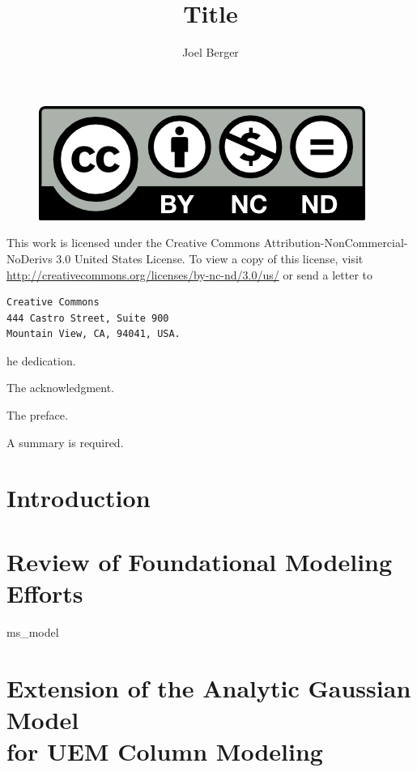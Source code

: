 \documentclass{uicthesi}
\title{Title}
\author{Joel Berger}
\begin{document}
\maketitle

\newpage
\begin{figure}
  \centering
  \includegraphics{by-nc-nd}
\end{figure}
This work is licensed under the Creative Commons Attribution-NonCommercial-NoDerivs 3.0 United States License.
To view a copy of this license, visit \url{http://creativecommons.org/licenses/by-nc-nd/3.0/us/} or send a letter to
\begin{verbatim}
Creative Commons
444 Castro Street, Suite 900
Mountain View, CA, 94041, USA.
\end{verbatim}


\dedication
The dedication.
 
\acknowledgment
The acknowledgment.
 
\preface
The preface.
 
\tableofcontents
\listoftables
\listoffigures
 

 
\summary
A summary is required.

\chapter{Introduction}

\chapter{Review of Foundational Modeling Efforts} \label{chap:previous_models}

  {ms_model}

\chapter{Extension of the Analytic Gaussian Model\\for UEM Column Modeling} \label{chap:extension}
\end{document}
